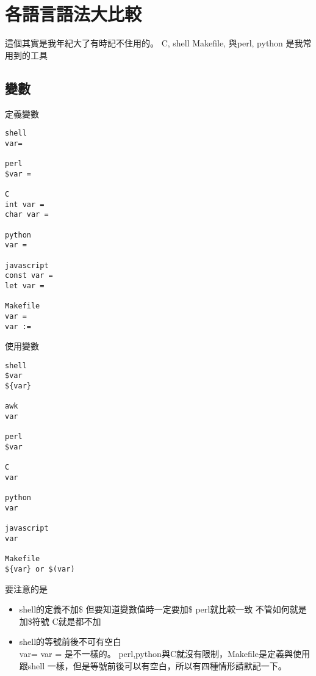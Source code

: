 \chapter{各語言語法大比較}
這個其實是我年紀大了有時記不住用的。
C, shell Makefile, 與perl, python 是我常用到的工具
  \section{變數}
  定義變數
  \begin{verbatim}
shell
var=

perl
$var =

C
int var =
char var =

python
var = 

javascript
const var =
let var = 

Makefile
var =
var :=
\end{verbatim}
使用變數
\begin{verbatim}
shell
$var
${var}

awk
var

perl
$var

C
var

python
var

javascript
var

Makefile
${var} or $(var)
  \end{verbatim}
  要注意的是
  \begin{itemize}
  \item shell的定義不加\$ 但要知道變數值時一定要加\$
  perl就比較一致 不管如何就是加\$符號
  C就是都不加
  \item shell的等號前後不可有空白\\
    var= var =
    是不一樣的。 perl,python與C就沒有限制，Makefile是定義與使用跟shell
    一樣，但是等號前後可以有空白，所以有四種情形請默記一下。
    \end{itemize}


